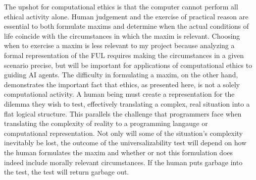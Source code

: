 \begin{isabellebody}
\begin{isamarkuptext}
The upshot for computational ethics is that the computer cannot perform all ethical activity alone. 
Human judgement and the exercise of practical reason are essential to both formulate maxims and 
determine when the actual conditions of life coincide with the circumstances in which the maxim is relevant. 
Choosing when to exercise a maxim is less relevant to my project because analyzing a formal representation of the FUL requires 
making the circumstances in a given scenario precise, but will be important for applications of 
computational ethics to guiding AI agents. The difficulty in formulating a maxim, on the other hand, demonstrates 
the important fact that ethics, as presented here, is not a solely computational activity. A
human being must create a representation for the dilemma they wish to test, effectively translating 
a complex, real situation into a flat logical structure. This parallels the challenge that programmers 
face when translating the complexity of reality to a programming langauge or computational representation. Not only will some of the situation's complexity
inevitably be lost, the outcome of the universalizability test will depend on how the human formulates the maxim
and whether or not this formulation does indeed include morally relevant circumstances. If the human puts 
garbage into the test, the test will return garbage out.


\end{isamarkuptext}
\end{isabellebody}
